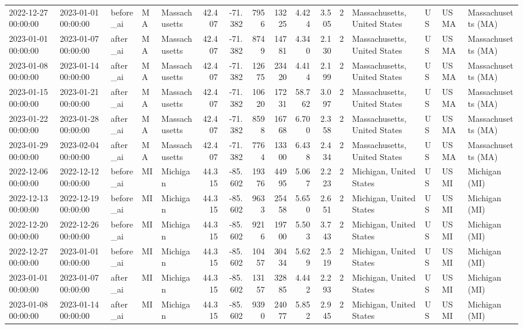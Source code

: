 \begin{tabular}{lllllrrrrrrlllll}
2022-12-27 00:00:00 & 2023-01-01 00:00:00 & before\_ai & MA & Massachusetts & 42.407 & -71.382 & 7956 & 13225 & 4.424 & 3.505 & 2 & Massachusetts, United States & US & USMA & Massachusetts (MA) \\
2023-01-01 00:00:00 & 2023-01-07 00:00:00 & after\_ai & MA & Massachusetts & 42.407 & -71.382 & 8749 & 14781 & 4.340 & 2.130 & 2 & Massachusetts, United States & US & USMA & Massachusetts (MA) \\
2023-01-08 00:00:00 & 2023-01-14 00:00:00 & after\_ai & MA & Massachusetts & 42.407 & -71.382 & 12675 & 23420 & 4.414 & 2.199 & 2 & Massachusetts, United States & US & USMA & Massachusetts (MA) \\
2023-01-15 00:00:00 & 2023-01-21 00:00:00 & after\_ai & MA & Massachusetts & 42.407 & -71.382 & 10620 & 17231 & 58.762 & 3.097 & 2 & Massachusetts, United States & US & USMA & Massachusetts (MA) \\
2023-01-22 00:00:00 & 2023-01-28 00:00:00 & after\_ai & MA & Massachusetts & 42.407 & -71.382 & 8598 & 16768 & 6.700 & 2.358 & 2 & Massachusetts, United States & US & USMA & Massachusetts (MA) \\
2023-01-29 00:00:00 & 2023-02-04 00:00:00 & after\_ai & MA & Massachusetts & 42.407 & -71.382 & 7764 & 13300 & 6.438 & 2.434 & 2 & Massachusetts, United States & US & USMA & Massachusetts (MA) \\
2022-12-06 00:00:00 & 2022-12-12 00:00:00 & before\_ai & MI & Michigan & 44.315 & -85.602 & 19376 & 44995 & 5.067 & 2.223 & 2 & Michigan, United States & US & USMI & Michigan (MI) \\
2022-12-13 00:00:00 & 2022-12-19 00:00:00 & before\_ai & MI & Michigan & 44.315 & -85.602 & 9633 & 25458 & 5.650 & 2.651 & 2 & Michigan, United States & US & USMI & Michigan (MI) \\
2022-12-20 00:00:00 & 2022-12-26 00:00:00 & before\_ai & MI & Michigan & 44.315 & -85.602 & 9216 & 19700 & 5.503 & 3.743 & 2 & Michigan, United States & US & USMI & Michigan (MI) \\
2022-12-27 00:00:00 & 2023-01-01 00:00:00 & before\_ai & MI & Michigan & 44.315 & -85.602 & 10457 & 30434 & 5.629 & 2.519 & 2 & Michigan, United States & US & USMI & Michigan (MI) \\
2023-01-01 00:00:00 & 2023-01-07 00:00:00 & after\_ai & MI & Michigan & 44.315 & -85.602 & 13157 & 32885 & 4.442 & 2.293 & 2 & Michigan, United States & US & USMI & Michigan (MI) \\
2023-01-08 00:00:00 & 2023-01-14 00:00:00 & after\_ai & MI & Michigan & 44.315 & -85.602 & 9390 & 24077 & 5.852 & 2.945 & 2 & Michigan, United States & US & USMI & Michigan (MI) \\

\end{tabular}
